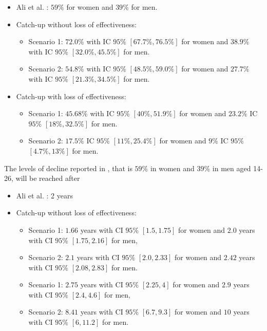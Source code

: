 \begin{itemize}
	\item Ali et al. \cite{ali2013genital}: $59\%$ for women and $39\%$ for men.
	\item Catch-up without loss of effectiveness:
	\begin{itemize}
	\item Scenario 1: $72.0\%$ with IC $95\%$ $[67.7\%, 76.5\%]$ for women and $38.9\%$ with IC $95\%$ $[32.0\%, 45.5\%]$ for men. 
	\item Scenario 2: $54.8\%$ with IC $95\%$ $[48.5\%, 59.0\%]$ for women and $27.7\%$ with IC $95\%$ $[21.3\%, 34.5\%]$ for men.
	\end{itemize} 
   	\item Catch-up with loss of effectiveness:
    \begin{itemize}
    	\item Scenario 1: $45.68\%$ with IC $95\%$ $[40\%, 51.9\%]$ for women and $23.2\%$ IC $95\%$ $[18\%, 32.5\%]$ for men.
    	\item Scenario 2: $17.5\%$ IC $95\%$ $[11\%, 25.4\%]$ for women and $9\%$ IC $95\%$ $[4.7\%, 13\% ]$ for men.
    \end{itemize} 
\end{itemize}

The levels of decline reported in \cite{ali2013genital}, that is $59\%$ in women and $39\%$ in men aged 14-26, will be reached after

\begin{itemize}
	\item Ali et al. \cite{ali2013genital}: 2 years
	\item Catch-up without loss of effectiveness:
	\begin{itemize}
	\item Scenario 1: $1.66$ years with CI $95\%$ $[1.5, 1.75]$ for women and $2.0$ years with CI $95\%$ $[1.75, 2.16]$ for men,
	\item Scenario 2: $2.1$ years with CI $95\%$ $[2.0, 2.33]$ for women and $2.42$ years with CI $95\%$ $[2.08, 2.83]$ for men.
	\end{itemize} 
	\begin{itemize}
	\item Scenario 1: $2.75$ years with CI $95\%$ $[2.25, 4]$ for women and $2.9$ years with CI $95\%$ $[2.4, 4.6]$ for men,
	\item Scenario 2: $8.41$ years with CI $95\%$ $[6.7, 9.3]$ for women and $10$ years with CI $95\%$ $[6, 11.2]$ for men.
	\end{itemize} 
\end{itemize}

